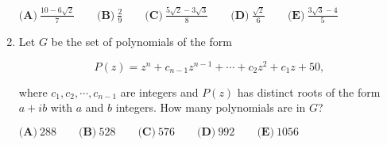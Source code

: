 \documentclass{article}
\begin{document}
\begin{enumerate}[label=\arabic*., itemsep=0.5em]
$\textbf{(A)}\  \frac{10-6\sqrt{2}}{7} \qquad \textbf{(B)}\ \frac{2}{9} \qquad \textbf{(C)}\ \frac{5\sqrt{2}-3\sqrt{3}}{8} \qquad \textbf{(D)}\ \frac{\sqrt{2}}{6} \qquad \textbf{(E)}\ \frac{3\sqrt{3}-4}{5}$\par \vspace{0.5em}\item Let $G$ be the set of polynomials of the form

\begin{equation*}
P(z)=z^n+c_{n-1}z^{n-1}+\cdots+c_2z^2+c_1z+50,
\end{equation*}

where $ c_1,c_2,\cdots, c_{n-1} $ are integers and $P(z)$ has distinct roots of the form $a+ib$ with $a$ and $b$ integers. How many polynomials are in $G$?

$ \textbf{(A)}\ 288\qquad\textbf{(B)}\ 528\qquad\textbf{(C)}\ 576\qquad\textbf{(D)}\ 992\qquad\textbf{(E)}\ 1056 $\par \vspace{0.5em}\end{enumerate}
\end{document}
